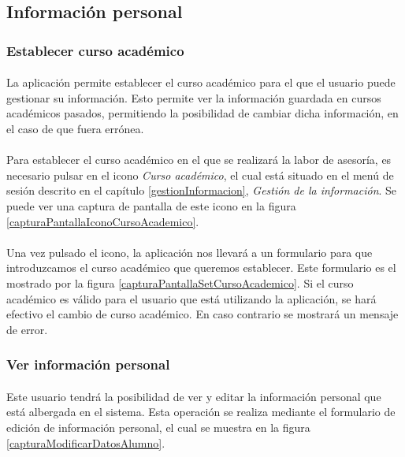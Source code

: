\subsection{Información personal}

  \subsubsection{Establecer curso académico}

  \paragraph{}La aplicación permite establecer el curso académico para el que
  el usuario puede gestionar su información. Esto permite ver la información
  guardada en cursos académicos pasados, permitiendo la posibilidad de cambiar
  dicha información, en el caso de que fuera errónea.

  \paragraph{}Para establecer el curso académico en el que se realizará la labor
  de asesoría, es necesario pulsar en el icono \textit{Curso académico}, el cual
  está situado en el menú de sesión descrito en el capítulo
  \ref{gestionInformacion}, \textit{Gestión de la información}. Se puede ver una
  captura de pantalla de este icono en la figura
  \ref{capturaPantallaIconoCursoAcademico}.

  \paragraph{}Una vez pulsado el icono, la aplicación nos llevará a un
  formulario para que introduzcamos el curso académico que queremos establecer.
  Este formulario es el mostrado por la figura
  \ref{capturaPantallaSetCursoAcademico}. Si el curso académico es válido para
  el usuario que está utilizando la aplicación, se hará efectivo el cambio de
  curso académico. En caso contrario se mostrará un mensaje de error.

  \subsubsection{Ver información personal}

  \paragraph{}Este usuario tendrá la posibilidad de ver y editar la información
  personal que está albergada en el sistema. Esta operación se realiza mediante
  el formulario de edición de información personal, el cual se muestra en la
  figura \ref{capturaModificarDatosAlumno}.

